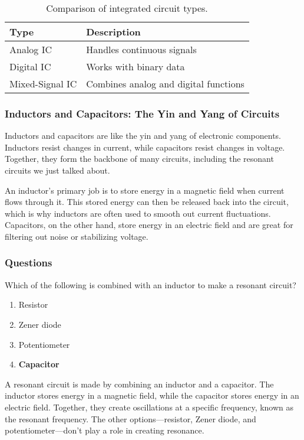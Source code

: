 \begin{table}[h!]
    \centering
    \begin{tabular}{|l|l|}
        \hline
        \textbf{Type} & \textbf{Description} \\
        \hline
        Analog IC & Handles continuous signals \\
        Digital IC & Works with binary data \\
        Mixed-Signal IC & Combines analog and digital functions \\
        \hline
    \end{tabular}
    \caption{Comparison of integrated circuit types.}
    \label{tab:ics}
\end{table}

\subsubsection*{Inductors and Capacitors: The Yin and Yang of Circuits}
Inductors and capacitors are like the yin and yang of electronic components. Inductors resist changes in current, while capacitors resist changes in voltage. Together, they form the backbone of many circuits, including the resonant circuits we just talked about.

An inductor’s primary job is to store energy in a magnetic field when current flows through it. This stored energy can then be released back into the circuit, which is why inductors are often used to smooth out current fluctuations. Capacitors, on the other hand, store energy in an electric field and are great for filtering out noise or stabilizing voltage.

\subsubsection{Questions}
\begin{tcolorbox}[colback=gray!10!white,colframe=black!75!black,title={T6D08}]
Which of the following is combined with an inductor to make a resonant circuit?
\begin{enumerate}[label=\Alph*),noitemsep]
    \item Resistor
    \item Zener diode
    \item Potentiometer
    \item \textbf{Capacitor}
\end{enumerate}
\end{tcolorbox}
A resonant circuit is made by combining an inductor and a capacitor. The inductor stores energy in a magnetic field, while the capacitor stores energy in an electric field. Together, they create oscillations at a specific frequency, known as the resonant frequency. The other options—resistor, Zener diode, and potentiometer—don’t play a role in creating resonance.

